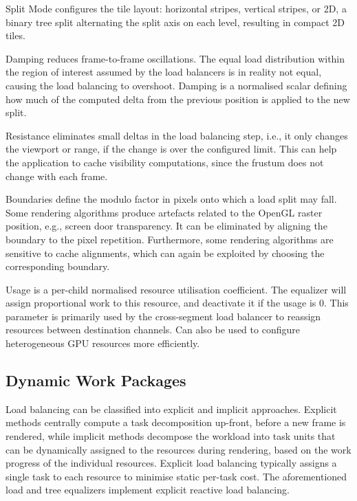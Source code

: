 \begin{compactdesc}
\item[Split Mode] configures the tile layout: horizontal stripes, vertical stripes,
or 2D, a binary tree split alternating the split axis on each level, resulting
in compact 2D tiles.
\item[Damping] reduces frame-to-frame oscillations. The equal load distribution
within the region of interest assumed by the load balancers is in reality not
equal, causing the load balancing to overshoot. Damping is a normalised scalar
defining how much of the computed delta from the previous position is applied to
the new split.

\item[Resistance] eliminates small deltas in the load balancing step, i.e., it
only changes the viewport or range, if the change is over the configured limit.
This can help the application to cache visibility computations, since the
frustum does not change with each frame.

\item[Boundaries] define the modulo factor in pixels onto which a load split may
fall. Some rendering algorithms produce artefacts related to the OpenGL raster
position, e.g., screen door transparency. It can be eliminated by aligning
the boundary to the pixel repetition. Furthermore, some rendering algorithms are
sensitive to cache alignments, which can again be exploited by choosing the
corresponding boundary.

\item[Usage] is a per-child normalised resource utilisation coefficient. The
equalizer will assign proportional work to this resource, and deactivate it if
the usage is 0. This parameter is primarily used by the cross-segment load
balancer to reassign resources between destination channels. Can also be
used to configure heterogeneous GPU resources more efficiently.

\end{compactdesc}

\subsection{Dynamic Work Packages}

Load balancing can be classified into explicit and implicit approaches.
Explicit methods centrally compute a task decomposition up-front, before a new
frame is rendered, while implicit methods decompose the workload into task
units that can be dynamically assigned to the resources during rendering, based
on the work progress of the individual resources. Explicit load balancing
typically assigns a single task to each resource to minimise static per-task
cost. The aforementioned load and tree equalizers implement explicit reactive load
balancing.

